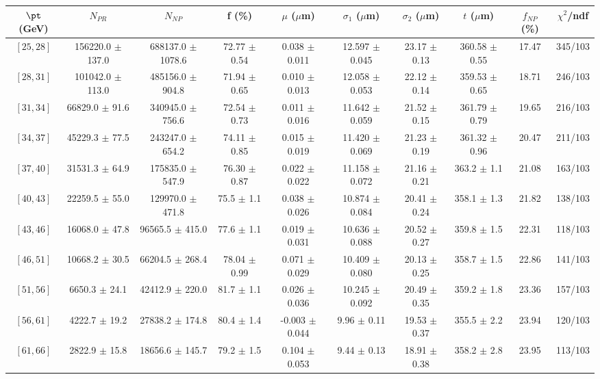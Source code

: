 \begin{tabular}{c||c|c|c|c|c|c|c||c|c}
$\pt$ (GeV) & $N_{PR}$ & $N_{NP}$ & f (\%) & $\mu$ ($\mu$m) & $\sigma_1$ ($\mu$m) & $\sigma_2$ ($\mu$m)  & $t$ ($\mu$m) & $f_{NP}$ (\%) & $\chi^2$/ndf \\
\hline
$[25, 28]$ & 156220.0 $\pm$ 137.0 & 688137.0 $\pm$ 1078.6 & 72.77 $\pm$ 0.54 & 0.038 $\pm$ 0.011 & 12.597 $\pm$ 0.045 & 23.17 $\pm$ 0.13 & 360.58 $\pm$ 0.55 & 17.47 & 345/103\\
$[28, 31]$ & 101042.0 $\pm$ 113.0 & 485156.0 $\pm$ 904.8 & 71.94 $\pm$ 0.65 & 0.010 $\pm$ 0.013 & 12.058 $\pm$ 0.053 & 22.12 $\pm$ 0.14 & 359.53 $\pm$ 0.65 & 18.71 & 246/103\\
$[31, 34]$ & 66829.0 $\pm$ 91.6 & 340945.0 $\pm$ 756.6 & 72.54 $\pm$ 0.73 & 0.011 $\pm$ 0.016 & 11.642 $\pm$ 0.059 & 21.52 $\pm$ 0.15 & 361.79 $\pm$ 0.79 & 19.65 & 216/103\\
$[34, 37]$ & 45229.3 $\pm$ 77.5 & 243247.0 $\pm$ 654.2 & 74.11 $\pm$ 0.85 & 0.015 $\pm$ 0.019 & 11.420 $\pm$ 0.069 & 21.23 $\pm$ 0.19 & 361.32 $\pm$ 0.96 & 20.47 & 211/103\\
$[37, 40]$ & 31531.3 $\pm$ 64.9 & 175835.0 $\pm$ 547.9 & 76.30 $\pm$ 0.87 & 0.022 $\pm$ 0.022 & 11.158 $\pm$ 0.072 & 21.16 $\pm$ 0.21 & 363.2 $\pm$ 1.1 & 21.08 & 163/103\\
$[40, 43]$ & 22259.5 $\pm$ 55.0 & 129970.0 $\pm$ 471.8 & 75.5 $\pm$ 1.1 & 0.038 $\pm$ 0.026 & 10.874 $\pm$ 0.084 & 20.41 $\pm$ 0.24 & 358.1 $\pm$ 1.3 & 21.82 & 138/103\\
$[43, 46]$ & 16068.0 $\pm$ 47.8 & 96565.5 $\pm$ 415.0 & 77.6 $\pm$ 1.1 & 0.019 $\pm$ 0.031 & 10.636 $\pm$ 0.088 & 20.52 $\pm$ 0.27 & 359.8 $\pm$ 1.5 & 22.31 & 118/103\\
$[46, 51]$ & 10668.2 $\pm$ 30.5 & 66204.5 $\pm$ 268.4 & 78.04 $\pm$ 0.99 & 0.071 $\pm$ 0.029 & 10.409 $\pm$ 0.080 & 20.13 $\pm$ 0.25 & 358.7 $\pm$ 1.5 & 22.86 & 141/103\\
$[51, 56]$ & 6650.3 $\pm$ 24.1 & 42412.9 $\pm$ 220.0 & 81.7 $\pm$ 1.1 & 0.026 $\pm$ 0.036 & 10.245 $\pm$ 0.092 & 20.49 $\pm$ 0.35 & 359.2 $\pm$ 1.8 & 23.36 & 157/103\\
$[56, 61]$ & 4222.7 $\pm$ 19.2 & 27838.2 $\pm$ 174.8 & 80.4 $\pm$ 1.4 & -0.003 $\pm$ 0.044 & 9.96 $\pm$ 0.11 & 19.53 $\pm$ 0.37 & 355.5 $\pm$ 2.2 & 23.94 & 120/103\\
$[61, 66]$ & 2822.9 $\pm$ 15.8 & 18656.6 $\pm$ 145.7 & 79.2 $\pm$ 1.5 & 0.104 $\pm$ 0.053 & 9.44 $\pm$ 0.13 & 18.91 $\pm$ 0.38 & 358.2 $\pm$ 2.8 & 23.95 & 113/103\\

\end{tabular}
